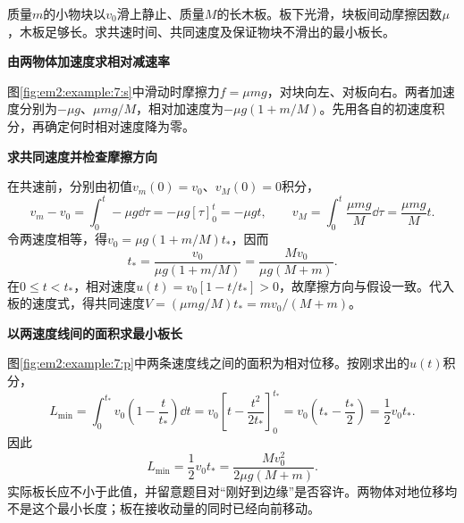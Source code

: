 \begin{question}\begin{example}[物块滑上自由木板]\label{em2:example:7}
质量$m$的小物块以$v_0$滑上静止、质量$M$的长木板。板下光滑，块板间动摩擦因数$\mu$，木板足够长。求共速时间、共同速度及保证物块不滑出的最小板长。
\end{example}
\end{question}
\begin{solution}\textbf{由两物体加速度求相对减速率}\par\nobreak
图\ref{fig:em2:example:7:s}中滑动时摩擦力$f=\mu mg$，对块向左、对板向右。两者加速度分别为$-\mu g$、$\mu mg/M$，相对加速度为$-\mu g(1+m/M)$。先用各自的初速度积分，再确定何时相对速度降为零。



\par\medskip{}\noindent\textbf{求共同速度并检查摩擦方向}\par\nobreak
在共速前，分别由初值$v_m(0)=v_0$、$v_M(0)=0$积分，
\[
v_m-v_0=\int_0^t-\mu g\dd\tau=-\mu g[\tau]_0^t=-\mu gt,
\qquad
v_M=\int_0^t\frac{\mu mg}{M}\dd\tau=\frac{\mu mg}{M}t.
\]
令两速度相等，得$v_0=\mu g(1+m/M)t_*$，因而
\[
t_*=\frac{v_0}{\mu g(1+m/M)}=\frac{Mv_0}{\mu g(M+m)}.
\]
在$0\le t<t_*$，相对速度$u(t)=v_0[1-t/t_*]>0$，故摩擦方向与假设一致。代入板的速度式，得共同速度$V=(\mu mg/M)t_*=mv_0/(M+m)$。



\par\medskip{}\noindent\textbf{以两速度线间的面积求最小板长}\par\nobreak
图\ref{fig:em2:example:7:p}中两条速度线之间的面积为相对位移。按刚求出的$u(t)$积分，
\[
L_{\min}=\int_0^{t_*}v_0\left(1-\frac{t}{t_*}\right)\dd t
=v_0\left[t-\frac{t^2}{2t_*}\right]_0^{t_*}
=v_0\left(t_*-\frac{t_*}{2}\right)=\frac12v_0t_*.
\]
因此
\[\boxed{L_{\min}=\frac12v_0t_* =\frac{Mv_0^2}{2\mu g(M+m)}}.\]
实际板长应不小于此值，并留意题目对“刚好到边缘”是否容许。两物体对地位移均不是这个最小长度；板在接收动量的同时已经向前移动。\end{solution}
